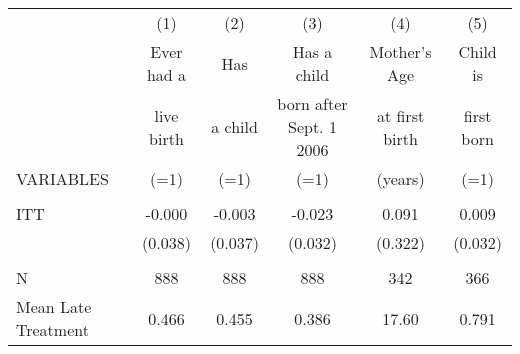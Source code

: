 \begin{tabular}{lccccc} \hline
 & (1) & (2) & (3) & (4) & (5) \\
 & Ever had a & Has & Has a child & Mother's Age & Child is \\
 & live birth & a child & born after Sept. 1 2006 & at first birth & first born \\
VARIABLES & (=1) & (=1) & (=1) & (years) & (=1) \\ \hline
 &  &  &  &  &  \\
ITT & -0.000 & -0.003 & -0.023 & 0.091 & 0.009 \\
 & (0.038) & (0.037) & (0.032) & (0.322) & (0.032) \\
 &  &  &  &  &  \\
N & 888 & 888 & 888 & 342 & 366 \\
 Mean Late Treatment & 0.466 & 0.455 & 0.386 & 17.60 & 0.791 \\ \hline
\end{tabular}

